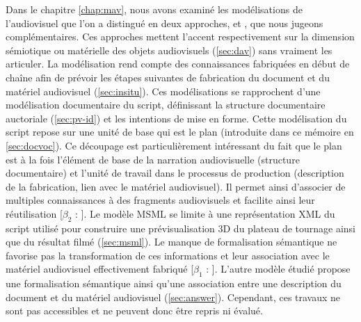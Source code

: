Dans le chapitre \ref{chap:mav}, nous avons examiné les modélisations de l'audiovisuel que l'on a distingué en deux approches,  et , que nous jugeons complémentaires. 
Ces approches mettent l'accent respectivement sur la dimension sémiotique ou matérielle des objets audiovisuels (\ref{sec:dav}) sans vraiment les articuler.
La modélisation  rend compte des connaissances fabriquées en début de chaîne afin de prévoir les étapes suivantes de fabrication du document et du matériel audiovisuel (\ref{sec:insitu}).
Ces modélisations se rapprochent d'une modélisation documentaire du script, définissant la structure documentaire auctoriale (\ref{sec:pv-id}) et les intentions de mise en forme.
Cette modélisation du script repose sur une unité de base qui est le plan (introduite dans ce mémoire en \ref{sec:docvoc}).
Ce découpage est particulièrement intéressant du fait que le plan est à la fois l'élément de base de la narration audiovisuelle (structure documentaire) et l'unité de travail dans le processus de production (description de la fabrication, lien avec le matériel audiovisuel). 
Il permet ainsi d'associer de multiples connaissances à des fragments audiovisuels et facilite ainsi leur réutilisation [$\beta_2$ : ].
Le modèle MSML se limite à une représentation XML du script utilisé pour construire une prévisualisation 3D du plateau de tournage ainsi que du résultat filmé (\ref{sec:msml}). 
Le manque de formalisation sémantique ne favorise pas la transformation de ces informations et leur association avec le matériel audiovisuel effectivement fabriqué [$\beta_1$ : ].
L'autre modèle étudié propose une formalisation sémantique ainsi qu'une association entre une description du document et du matériel audiovisuel (\ref{sec:answer}).
Cependant, ces travaux ne sont pas accessibles et ne peuvent donc être repris ni évalué.

